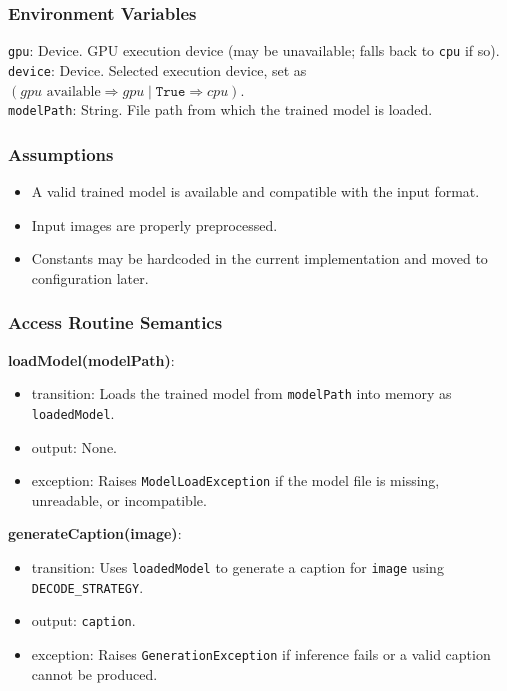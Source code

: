 \documentclass[12pt, titlepage]{article}
\begin{document}
\subsubsection{Environment Variables}
\texttt{gpu}: Device. GPU execution device (may be unavailable; falls back to \texttt{cpu} if so).\\
\texttt{device}: Device. Selected execution device, set as $(gpu \text{ available} \Rightarrow gpu \mid \mathtt{True} \Rightarrow cpu)$.\\
\texttt{modelPath}: String. File path from which the trained model is loaded.

\subsubsection{Assumptions}
\begin{itemize}
  \item A valid trained model is available and compatible with the input format.
  \item Input images are properly preprocessed.
  \item Constants may be hardcoded in the current implementation and moved to configuration later.
\end{itemize}

\subsubsection{Access Routine Semantics}
\noindent \textbf{loadModel(modelPath)}:
\begin{itemize}
  \item transition: Loads the trained model from \texttt{modelPath} into memory as \texttt{loadedModel}.
  \item output: None.
  \item exception: Raises \texttt{ModelLoadException} if the model file is missing, unreadable, or incompatible.
\end{itemize}

\noindent \textbf{generateCaption(image)}:
\begin{itemize}
  \item transition: Uses \texttt{loadedModel} to generate a caption for \texttt{image} using \texttt{DECODE\_STRATEGY}.
\item output: \texttt{caption}.
  \item exception: Raises \texttt{GenerationException} if inference fails or a valid caption cannot be produced.
\end{itemize}
\end{document}
